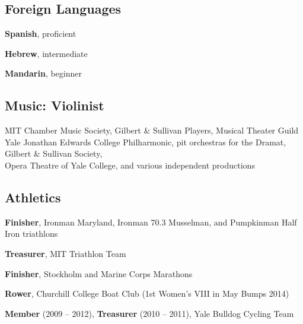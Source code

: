 \vspace{-1mm}
\subsection{Foreign Languages}
\vspace{-1mm}
{}{\textbf{Spanish}, proficient}{}

{}{\textbf{Hebrew}, intermediate}{}

{}{\textbf{Mandarin}, beginner}{}

\vspace{-3.5mm}
\subsection{Music: Violinist}
\vspace{-1mm}
{MIT}
{Chamber Music Society, Gilbert \& Sullivan Players, Musical Theater Guild}{}
{Yale}
{Jonathan Edwards College Philharmonic, pit orchestras for the Dramat, Gilbert \& Sullivan Society,\\Opera Theatre of Yale College, and various independent productions}{}

\vspace{-3.5mm}
\subsection{Athletics}
\vspace{-1mm}
{}{\textbf{Finisher}, Ironman Maryland, Ironman 70.3 Musselman, and Pumpkinman Half Iron triathlons}{}

{}{\textbf{Treasurer}, MIT Triathlon Team}{}

{}{\textbf{Finisher}, Stockholm and Marine Corps Marathons}{}

{}{\textbf{Rower}, Churchill College Boat Club (1st Women's VIII in May Bumps 2014)}{}

{}{\textbf{Member} (2009 -- 2012), \textbf{Treasurer} (2010 -- 2011), Yale Bulldog Cycling Team}{}
